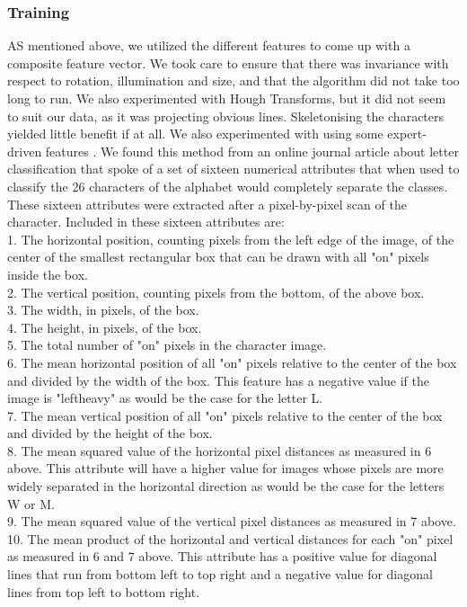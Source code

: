 \subsubsection{Training}
AS mentioned above, we utilized the different features to come up with a composite feature vector.
We took care to ensure that there was invariance with respect to rotation, illumination and size,
and that the algorithm did not take too long to run. We also experimented with Hough Transforms,
but it did not seem to suit our data, as it was projecting obvious lines. Skeletonising the characters
yielded little benefit if at all. We also experimented with using some expert-driven features \cite{frey}. We 
found this method from an online journal article about letter classification that 
spoke of a set of sixteen numerical attributes that when used to 
classify the 26 characters of the alphabet would completely separate the classes. 
These sixteen attributes were extracted after a pixel-by-pixel scan of the character. 
Included in these sixteen attributes are:\\
1. The horizontal position, counting pixels from the left edge of the image, of the center of the smallest 	rectangular box that can be drawn with all "on" pixels inside the box.\\
2. The vertical position, counting pixels from the bottom, of the above box.\\
3. The width, in pixels, of the box.\\
4. The height, in pixels, of the box.\\
5. The total number of "on" pixels in the character image.\\
6. The mean horizontal position of all "on" pixels relative to the center of the box and divided by the 	width of the box. This feature has a negative value if the image is "leftheavy" as would be the 	case for the letter L.\\
7. The mean vertical position of all "on" pixels relative to the center of the box and divided by the 	height of the box.\\
8. The mean squared value of the horizontal pixel distances as measured in 6 above. This attribute will 	have a higher value for images whose pixels are more widely separated in the horizontal 	direction as would be the case for the letters W or M.\\
9. The mean squared value of the vertical pixel distances as measured in 7 above.\\
10. The mean product of the horizontal and vertical distances for each "on" pixel as measured in 6 and 	7 above. This attribute has a positive value for diagonal lines that run from bottom left to top 	right and a negative value for diagonal lines from top left to bottom right.\\
